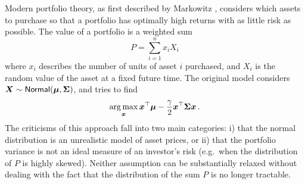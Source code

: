 \begin{example}

Modern portfolio theory, as first described by Markowitz \cite{markowitz1952portfolio}, considers which assets to purchase so that a portfolio has optimally high returns with as little risk as possible. The value of a portfolio is a weighted sum
\[ P = \sum_{i=1}^n x_i X_i   \]
where $x_i$ describes the number of units of asset $i$ purchased, and $X_i$ is the random value of the asset at a fixed future time. The original model considers $\bm{X} \sim \mathsf{Normal}(\bm{\mu}, \bm{\Sigma})$, and tries to find
\[ \operatorname*{arg\,max}_{\bm{x}} \bm{x}^\top \bm{\mu} - \frac{\gamma}{2} \bm{x}^\top \bm{\Sigma} \bm{x} \,. \]
The criticisms of this approach fall into two main categories: i) that the normal distribution is an unrealistic model of asset prices, or ii) that the portfolio variance is not an ideal measure of an investor's risk (e.g.\ when the distribution of $P$ is highly skewed). Neither assumption can be substantially relaxed without dealing with the fact that the distribution of the sum $P$ is no longer tractable.
\remQED
\end{example}

